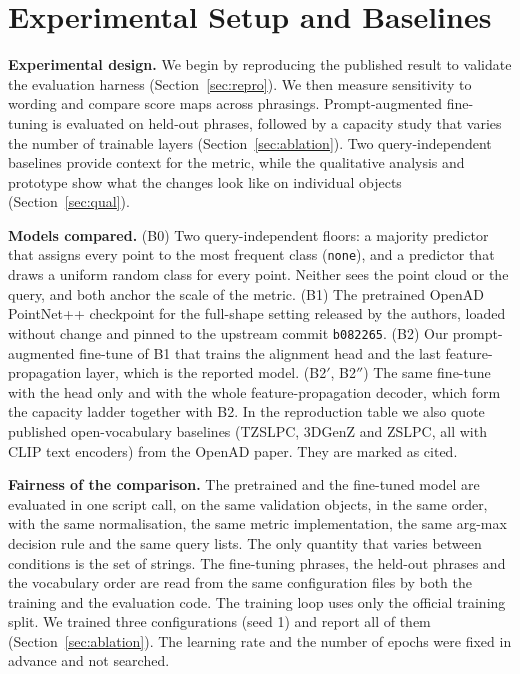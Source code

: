 \documentclass[conference]{IEEEtran}
\begin{document}
\section{Experimental Setup and Baselines}
\label{sec:setup}

\textbf{Experimental design.} We begin by reproducing the published result to validate the evaluation harness (Section~\ref{sec:repro}). We then measure sensitivity to wording and compare score maps across phrasings. Prompt-augmented fine-tuning is evaluated on held-out phrases, followed by a capacity study that varies the number of trainable layers (Section~\ref{sec:ablation}). Two query-independent baselines provide context for the metric, while the qualitative analysis and prototype show what the changes look like on individual objects (Section~\ref{sec:qual}).

\textbf{Models compared.} (B0) Two query-independent floors: a majority predictor that assigns every point to the most frequent class (\texttt{none}), and a predictor that draws a uniform random class for every point. Neither sees the point cloud or the query, and both anchor the scale of the metric. (B1) The pretrained OpenAD PointNet++ checkpoint for the full-shape setting released by the authors, loaded without change and pinned to the upstream commit \texttt{b082265}. (B2) Our prompt-augmented fine-tune of B1 that trains the alignment head and the last feature-propagation layer, which is the reported model. (B2$'$, B2$''$) The same fine-tune with the head only and with the whole feature-propagation decoder, which form the capacity ladder together with B2. In the reproduction table we also quote published open-vocabulary baselines (TZSLPC, 3DGenZ and ZSLPC, all with CLIP text encoders) from the OpenAD paper. They are marked as cited.

\textbf{Fairness of the comparison.} The pretrained and the fine-tuned model are evaluated in one script call, on the same validation objects, in the same order, with the same normalisation, the same metric implementation, the same arg-max decision rule and the same query lists. The only quantity that varies between conditions is the set of strings. The fine-tuning phrases, the held-out phrases and the vocabulary order are read from the same configuration files by both the training and the evaluation code. The training loop uses only the official training split. We trained three configurations (seed 1) and report all of them (Section~\ref{sec:ablation}). The learning rate and the number of epochs were fixed in advance and not searched.
\end{document}
